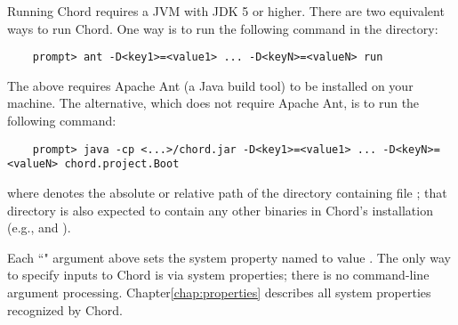 Running Chord requires a JVM with JDK 5 or higher.
There are two equivalent ways to run Chord.
One way is to run the following command in the  directory:

\begin{verbatim}
    prompt> ant -D<key1>=<value1> ... -D<keyN>=<valueN> run
\end{verbatim}

The above requires Apache Ant (a Java build tool) to be installed on your machine.  The alternative, which
does not require Apache Ant, is to run the following command:

\begin{verbatim}
    prompt> java -cp <...>/chord.jar -D<key1>=<value1> ... -D<keyN>=<valueN> chord.project.Boot
\end{verbatim}

where  denotes the absolute or relative path of the directory containing file ;
that directory is also expected to contain any other binaries in Chord's installation
(e.g.,  and ).

Each ``" argument above sets the system property named  to value
.  The only way to specify inputs to Chord is via system properties; there is no
command-line argument processing.
Chapter\ref{chap:properties} describes all system properties recognized by Chord.

